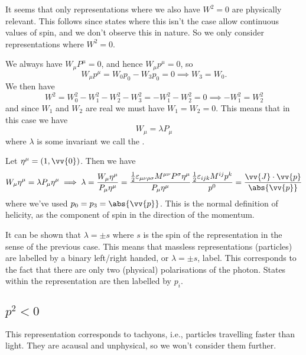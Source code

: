 \documentclass[fleqn]{NotesClass}
\begin{document}
    It seems that only representations where we also have \(W^2 = 0\) are physically relevant.
    This follows since states where this isn't the case allow continuous values of spin, and we don't observe this in nature.
    So we only consider representations where \(W^2 = 0\).
    
    We always have \(W_\mu P^\mu = 0\), and hence \(W_\mu p^\mu = 0\), so
    \begin{equation}
        W_\mu p^\mu = W_0 p_0  - W_3p_0 = 0 \implies W_3 = W_0.
    \end{equation}
    We then have
    \begin{equation}
        W^2 = W_0^2 - W_1^2 - W_2^2 - W_3^2 = -W_1^2 - W_2^2 = 0 \implies -W_1^2 = W_2^2
    \end{equation}
    and since \(W_1\) and \(W_2\) are real we must have \(W_1 = W_2 = 0\).
    This means that in this case we have
    \begin{equation}
        W_\mu = \lambda P_\mu
    \end{equation}
    where \(\lambda\) is some invariant we call the .
    
    Let \(\eta^\mu = (1, \vv{0})\).
    Then we have
    \begin{equation}
        W_\mu \eta^\mu = \lambda P_\mu \eta^\mu \implies \lambda = \frac{W_\mu \eta^\mu}{P_\mu \eta^\mu} = \frac{\frac{1}{2}\varepsilon_{\mu\nu\rho\sigma}M^{\mu\nu}P^\sigma \eta^\mu}{P_\mu \eta^\mu} \frac{\frac{1}{2}\varepsilon_{ijk}M^{ij}p^k}{p^0} = \frac{\vv{J} \cdot \vv{p}}{\abs{\vv{p}}}
    \end{equation}
    where we've used \(p_0 = p_3 = \abs{\vv{p}}\).
    This is the normal definition of helicity, as the component of spin in the direction of the momentum.
    
    It can be shown that \(\lambda = \pm s\) where \(s\) is the spin of the representation in the sense of the previous case.
    This means that massless representations (particles) are labelled by a binary left/right handed, or \(\lambda = \pm s\), label.
    This corresponds to the fact that there are only two (physical) polarisations of the photon.
    States within the representation are then labelled by \(p_i\).
    
    \subsection{\texorpdfstring{\(p^2 < 0\)}{p squared Negative}}
    This representation corresponds to tachyons, i.e., particles travelling faster than light.
    They are acausal and unphysical, so we won't consider them further.
    
\end{document}
